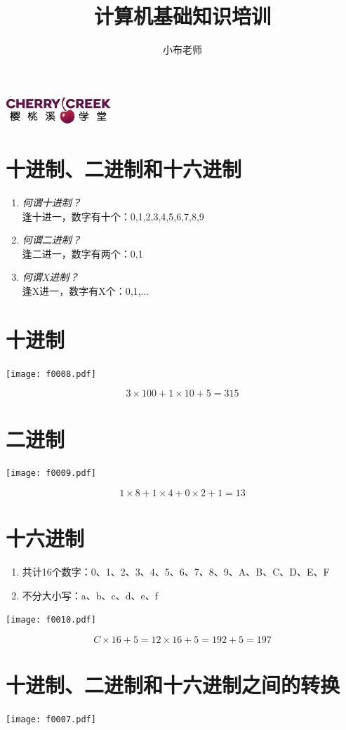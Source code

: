 \documentclass[cn,hazy,blue,14pt,screen]{elegantnote}
\title{计算机基础知识培训}
\author{小布老师}
\institute{樱桃溪学院}
\begin{document}
\maketitle

\centerline{
  \includegraphics[width=0.3\textwidth]{ccalogo.png}
}

\newpage
\section{十进制、二进制和十六进制}

\begin{enumerate}[label=\arabic*).]
  \item \textit{何谓十进制？}\\
    逢十进一，数字有十个：0,1,2,3,4,5,6,7,8,9
  \item \textit{何谓二进制？}\\
    逢二进一，数字有两个：0,1
  \item \textit{何谓X进制？}\\
    逢X进一，数字有X个：0,1,...
\end{enumerate}

\newpage
\section{十进制}
\centerline{
  \texttt{[image: f0008.pdf]}
}

{\Huge
\[
3 \times 100 + 1 \times 10 + 5 = 315
\]
}

\newpage
\section{二进制}
\centerline{
  \texttt{[image: f0009.pdf]}
}

{\Huge
\[
1 \times 8 + 1 \times 4 + 0 \times 2 + 1 = 13
\]
}

\newpage
\section{十六进制}
\begin{enumerate}
  \item 共计16个数字：0、1、2、3、4、5、6、7、8、9、A、B、C、D、E、F
  \item 不分大小写：a、b、c、d、e、f
\end{enumerate}

\centerline{
  \texttt{[image: f0010.pdf]}
}

{\Huge
\[
C \times 16 + 5 = 12 \times 16 + 5 = 192 + 5 = 197
\]
}

\section{十进制、二进制和十六进制之间的转换}
\centerline{
  \texttt{[image: f0007.pdf]}
}

\end{document}
